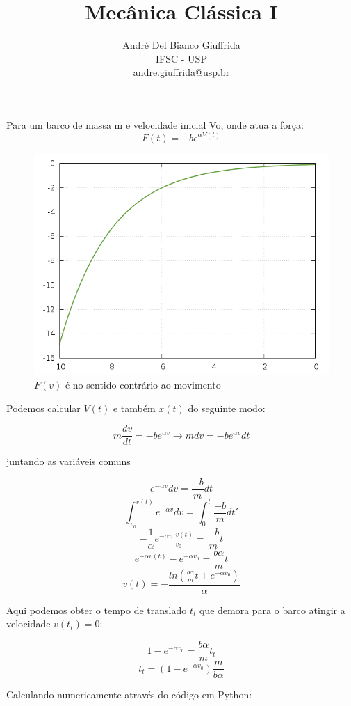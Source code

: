 \documentclass[a4paper,12pt]{article}
\title{ Mecânica Clássica I}
\author{\small André Del Bianco Giuffrida\\ \small IFSC - USP\\ \small andre.giuffrida@usp.br}
\date{}
\begin{document}
\maketitle
	Para um barco de massa m e velocidade inicial Vo, onde atua a força:
		\[ F(t)= -b e^{\alpha V(t)}\]
		
		\begin{figure}[h]
			\centering
			\includegraphics[scale=0.6]{3o0.png}
			\caption{$F(v)$ é no sentido contrário ao movimento}
		\end{figure}
		
	Podemos calcular $V(t)$ e também $x(t)$ do seguinte modo:
	
		\[ m \frac{dv}{dt} = -b e^{\alpha v} \to  m dv = -b e^{\alpha v} dt\]
		
		juntando as variáveis comuns
		
		\[ e^{-\alpha v} dv = \frac{-b}{m}  dt \] \[ \int_{v_0}^{v(t)} e^{-\alpha v} dv = \int_0^t \frac{-b}{m}  dt'\]
		\[ -\frac{1}{\alpha} e^{-\alpha v} \Bigg|_{v_0}^{v(t)}= \frac{-b}{m} t \]
		\[ e^{-\alpha v(t)} - e^{-\alpha v_0}= \frac{b \alpha}{m} t \]
		\[ v(t) = -\frac{ln(\frac{b \alpha}{m} t + e^{-\alpha v_0} ) }{\alpha } \]
		
		Aqui podemos obter o tempo de translado $t_t$ que demora para o barco atingir a velocidade $v(t_t)=0$:
		
		\[ 1 - e^{-\alpha v_0}= \frac{b \alpha}{m} t_t \]
		\[  t_t =( 1 - e^{-\alpha v_0} )\frac{m}{b \alpha} \]
		
		Calculando numericamente através do código em Python:
		
\end{document}
